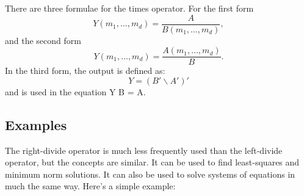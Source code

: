 There are three formulae for the times operator. For the first form \[ Y(m_1,\ldots,m_d) = \frac{A}{B(m_1,\ldots,m_d)}, \] and the second form \[ Y(m_1,\ldots,m_d) = \frac{A(m_1,\ldots,m_d)}{B}. \] In the third form, the output is defined as\-: \[ Y = (B' \backslash A')' \] and is used in the equation {\ttfamily Y B = A}. \hypertarget{variables_matrix_Examples}{}\subsection{Examples}\label{variables_matrix_Examples}
The right-\/divide operator is much less frequently used than the left-\/divide operator, but the concepts are similar. It can be used to find least-\/squares and minimum norm solutions. It can also be used to solve systems of equations in much the same way. Here's a simple example\-:


